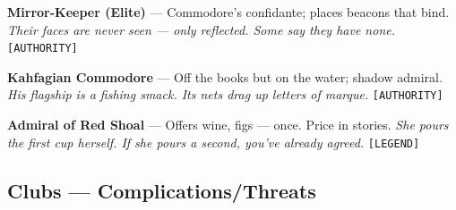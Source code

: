\begin{enumerate}[label={[\Alph*]}]
\item \textbf{Mirror-Keeper (Elite)} --- Commodore's confidante; places beacons that bind. \hfill \textit{Their faces are never seen --- only reflected. Some say they have none.} \texttt{[AUTHORITY]}
\item \textbf{Kahfagian Commodore} --- Off the books but on the water; shadow admiral. \hfill \textit{His flagship is a fishing smack. Its nets drag up letters of marque.} \texttt{[AUTHORITY]}
\item \textbf{Admiral of Red Shoal} --- Offers wine, figs --- once. Price in stories. \hfill \textit{She pours the first cup herself. If she pours a second, you've already agreed.} \texttt{[LEGEND]}
\end{enumerate}

\subsection*{Clubs --- Complications/Threats}
\label{sec:kahfagia-complications}

